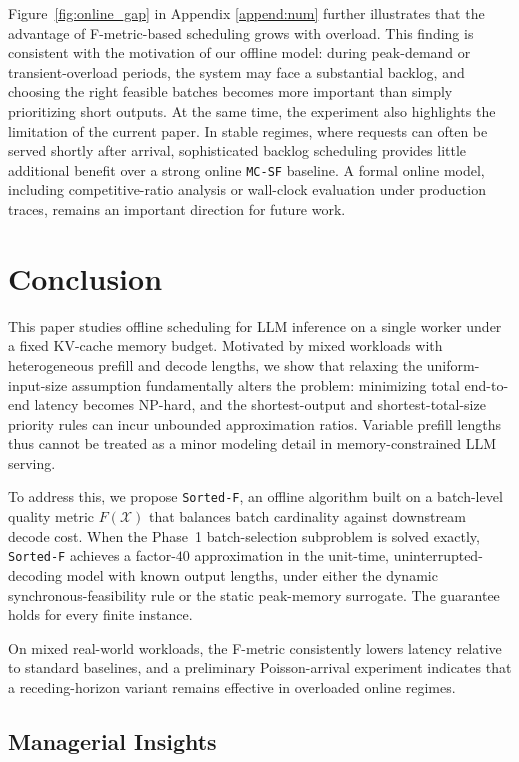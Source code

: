 \documentclass[nonblindrev]{informs3_hide}
\newcommand{\mcsdf}{\texttt{MC-SF}}
\newcommand{\sortF}{\texttt{Sorted-F}}
\begin{document}
Figure~\ref{fig:online_gap} in Appendix \ref{append:num} further illustrates that the advantage of F-metric-based scheduling grows with overload. This finding is consistent with the motivation of our offline model: during peak-demand or transient-overload periods, the system may face a substantial backlog, and choosing the right feasible batches becomes more important than simply prioritizing short outputs. At the same time, the experiment also highlights the limitation of the current paper. In stable regimes, where requests can often be served shortly after arrival, sophisticated backlog scheduling provides little additional benefit over a strong online \mcsdf{} baseline. A formal online model, including competitive-ratio analysis or wall-clock evaluation under production traces, remains an important direction for future work.


\section{Conclusion} \label{sec:conclusion}

This paper studies offline scheduling for LLM inference on a single worker under a fixed KV-cache memory budget. Motivated by mixed workloads with heterogeneous prefill and decode lengths, we show that relaxing the uniform-input-size assumption fundamentally alters the problem: minimizing total end-to-end latency becomes NP-hard, and the shortest-output and shortest-total-size priority rules can incur unbounded approximation ratios. Variable prefill lengths thus cannot be treated as a minor modeling detail in memory-constrained LLM serving.

To address this, we propose \sortF{}, an offline algorithm built on a batch-level quality metric $F(\mathcal{X})$ that balances batch cardinality against downstream decode cost. When the Phase~1 batch-selection subproblem is solved exactly, \sortF{} achieves a factor-$40$ approximation in the unit-time, uninterrupted-decoding model with known output lengths, under either the dynamic synchronous-feasibility rule or the static peak-memory surrogate. The guarantee holds for every finite instance.

On mixed real-world workloads, the F-metric consistently lowers latency relative to standard baselines, and a preliminary Poisson-arrival experiment indicates that a receding-horizon variant remains effective in overloaded online regimes.

\subsection{Managerial Insights}
\end{document}
